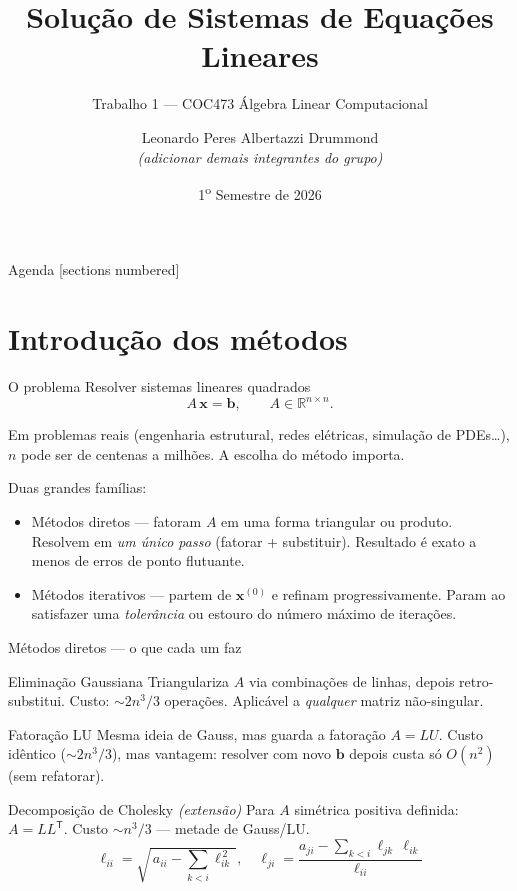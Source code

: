 \documentclass[10pt,aspectratio=169]{beamer}
\title{Solução de Sistemas de Equações Lineares}
\subtitle{Trabalho 1 --- COC473 Álgebra Linear Computacional}
\author{Leonardo Peres Albertazzi Drummond \\ \textit{\small(adicionar demais integrantes do grupo)}}
\institute{ECI / Politécnica --- UFRJ}
\date{1\textsuperscript{o} Semestre de 2026}
\begin{document}
\maketitle

\begin{frame}{Agenda}
  [sections numbered]
  \tableofcontents[hideallsubsections]
\end{frame}

\section{Introdução dos métodos}

\begin{frame}{O problema}
  Resolver sistemas lineares quadrados
  \[ A\,\mathbf{x} = \mathbf{b}, \qquad A \in \mathbb{R}^{n\times n}. \]

  \vspace{0.6em}
  Em problemas reais (engenharia estrutural, redes elétricas, simulação de PDEs\dots), $n$ pode ser de centenas a milhões. A escolha do método importa.

  \vspace{0.6em}
  Duas grandes famílias:
  \begin{itemize}
    \item \alert{Métodos diretos} --- fatoram $A$ em uma forma triangular ou produto. Resolvem em \emph{um único passo} (fatorar + substituir). Resultado é exato a menos de erros de ponto flutuante.
    \item \alert{Métodos iterativos} --- partem de $\mathbf{x}^{(0)}$ e refinam progressivamente. Param ao satisfazer uma \emph{tolerância} ou estouro do número máximo de iterações.
  \end{itemize}
\end{frame}

\begin{frame}{Métodos diretos --- o que cada um faz}
  \begin{block}{Eliminação Gaussiana}
    Triangulariza $A$ via combinações de linhas, depois retro-substitui. Custo: $\sim 2n^3/3$ operações. Aplicável a \emph{qualquer} matriz não-singular.
  \end{block}

  \begin{block}{Fatoração LU}
    Mesma ideia de Gauss, mas guarda a fatoração $A = LU$. Custo idêntico ($\sim 2n^3/3$), mas \alert{vantagem}: resolver com novo $\mathbf{b}$ depois custa só $O(n^2)$ (sem refatorar).
  \end{block}

  \begin{block}{Decomposição de Cholesky \textit{(extensão)}}
    Para $A$ \alert{simétrica positiva definida}: $A = L L^\mathsf{T}$. Custo $\sim n^3/3$ --- \alert{metade} de Gauss/LU.
    \[ \ell_{ii} = \sqrt{\,a_{ii} - \sum_{k<i} \ell_{ik}^{\,2}\,}, \quad \ell_{ji} = \frac{a_{ji} - \sum_{k<i} \ell_{jk}\,\ell_{ik}}{\ell_{ii}} \]
  \end{block}
\end{frame}
\end{document}
